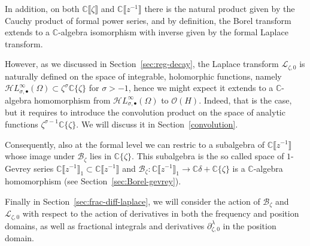 \documentclass{article}
\newcommand{\singexp}[2]{\mathcal{H}L^\infty_{#1, #2}}
\newcommand{\singexpalg}[1]{\singexp{#1}{\bullet}}
\newcommand{\C}{\mathbb{C}}
\newcommand{\fracderiv}[3]{\partial^{#1}_{#2, #3}}
\newcommand{\laplace}{\mathcal{L}}
\newcommand{\borel}{\mathcal{B}}
\theoremstyle{definition}
\theoremstyle{plain}
\begin{document}
In addition, on both $\C\llbracket\zeta\rrbracket$ and $\C\llbracket z^{-1}\rrbracket$ there is the natural product given by the Cauchy product of formal power series, and by definition, the Borel transform extends to a $\C$-algebra isomorphism with inverse given by the formal Laplace transform.

However, as we discussed in Section~\ref{sec:reg-decay}, the Laplace transform $\laplace_{\zeta,0}$ is naturally defined on the space of integrable, holomorphic functions, namely $\singexpalg{\sigma}(\Omega)\subset \zeta^{\sigma}\C\lbrace\zeta\rbrace$ for $\sigma>-1$, hence we might expect it extends to a $\C$-algebra homomorphism from $\singexpalg{\sigma}(\Omega)$ to $\mathcal{O}(H)$. Indeed, that is the case, but it requires to introduce the convolution product on the space of analytic functions $\zeta^{\sigma-1}\C\lbrace\zeta\rbrace$. We will discuss it in Section~\ref{convolution}. 

Consequently, also at the formal level we can restric to a subalgebra of $\C\llbracket z^{-1}\rrbracket$ whose image under $\borel_\zeta$ lies in $\C\lbrace\zeta\rbrace$. This subalgebra is the so called space of $1$-Gevrey series $\C\llbracket z^{-1}\rrbracket_1\subset\C\llbracket z^{-1}\rrbracket$ and $\borel_\zeta\colon \C\llbracket z^{-1}\rrbracket_1\to\C\delta+\C\lbrace\zeta\rbrace$ is a $\C$-algebra homomorphism (see Section~\ref{sec:Borel-gevrey}). 

Finally in Section~\ref{sec:frac-diff-laplace}, we will consider the action of $\borel_\zeta$ and $\laplace_{\zeta,0}$ with respect to the action of derivatives in both the frequency and position domains, as well as fractional integrals and derivatives $\fracderiv{\lambda}{\zeta}{0}$ in the position domain.
\end{document}
